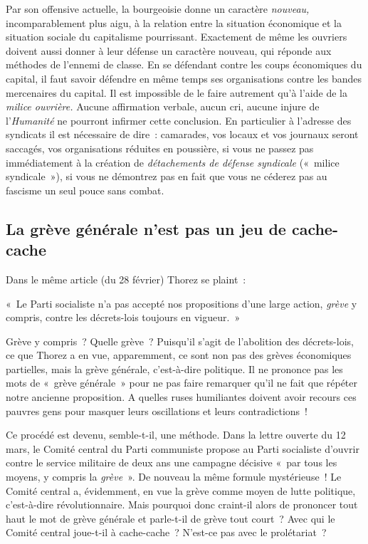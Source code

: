 \documentclass[french,twoside]{book} %
\newenvironment{quoteblock}%
  {\begin{quoting}}
  {\end{quoting}}
\newenvironment{quotebar}{%
    \def\FrameCommand{{\color{rubric!10!}\vrule width 0.5em} \hspace{0.9em}}%
    \def\OuterFrameSep{\itemsep} %
    \MakeFramed {\advance\hsize-\width \FrameRestore}
  }%
  {%
    \endMakeFramed
  }
\renewenvironment{quoteblock}%
  {%
    \savenotes
    \setstretch{0.9}
    \normalfont
    \begin{quotebar}
  }
  {%
    \end{quotebar}
    \spewnotes
  }
\begin{document}
Par son offensive actuelle, la bourgeoisie donne un caractère \emph{nouveau,} incomparablement plus aigu, à la relation entre la situation économique et la situation sociale du capitalisme pourrissant. Exactement de même les ouvriers doivent aussi donner à leur défense un caractère nouveau, qui réponde aux méthodes de l’ennemi de classe. En se défendant contre les coups économiques du capital, il faut savoir défendre en même temps ses organisations contre les bandes mercenaires du capital. Il est impossible de le faire autrement qu’à l’aide de la \emph{milice ouvrière.} Aucune affirmation verbale, aucun cri, aucune injure de l’\emph{Humanité} ne pourront infirmer cette conclusion. En particulier à l’adresse des syndicats il est nécessaire de dire : camarades, vos locaux et vos journaux seront saccagés, vos organisations réduites en poussière, si vous ne passez pas immédiatement à la création de \emph{détachements de défense syndicale} (« milice syndicale »), si  vous ne démontrez pas en fait que vous ne céderez pas au fascisme un seul pouce sans combat.
\subsection[{La grève générale n’est pas un jeu de cache-cache}]{La grève générale n’est pas un jeu de cache-cache}
Dans le même article (du 28 février) Thorez se plaint :\par

\begin{quoteblock}
 \noindent « Le Parti socialiste n’a pas accepté nos propositions d’une large action, \emph{grève} y compris, contre les décrets-lois toujours en vigueur. »
 \end{quoteblock}

\noindent Grève y compris ? Quelle grève ? Puisqu’il s’agit de l’abolition des décrets-lois, ce que Thorez a en vue, apparemment, ce sont non pas des grèves économiques partielles, mais la grève générale, c’est-à-dire politique. Il ne prononce pas les mots de « grève générale » pour ne pas faire remarquer qu’il ne fait que répéter notre ancienne proposition. A quelles ruses humiliantes doivent avoir recours ces pauvres gens pour masquer leurs oscillations et leurs contradictions !\par
Ce procédé est devenu, semble-t-il, une méthode. Dans la lettre ouverte du 12 mars, le Comité central du Parti communiste propose au Parti socialiste d’ouvrir contre le service militaire de deux ans une campagne décisive « par tous les moyens, y compris la \emph{grève} ». De nouveau la même formule mystérieuse ! Le Comité central a, évidemment, en vue la grève comme moyen de lutte politique, c’est-à-dire révolutionnaire. Mais pourquoi donc craint-il alors de prononcer tout haut le mot de grève générale et parle-t-il de grève tout court ? Avec qui le Comité central joue-t-il à cache-cache ? N’est-ce pas avec le prolétariat ?
\end{document}
